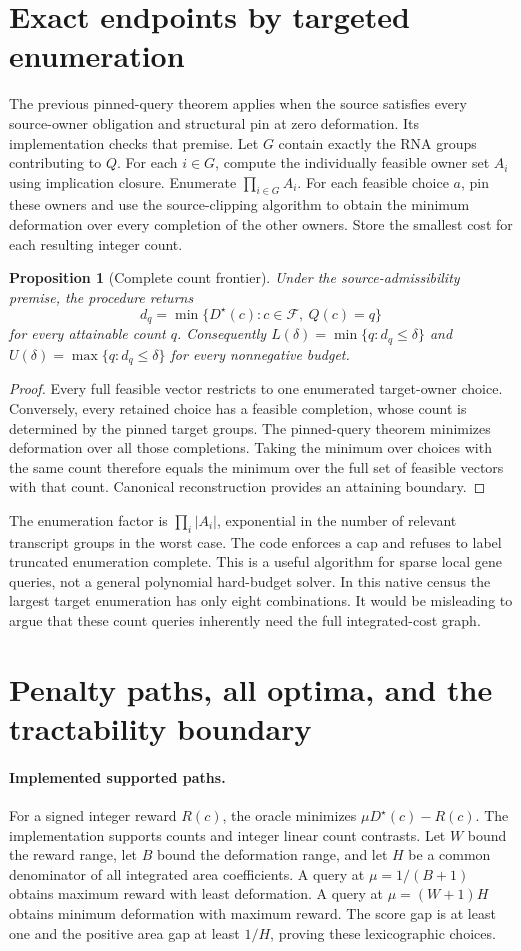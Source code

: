 \documentclass[11pt,letterpaper]{article}
\newtheorem{proposition}{Proposition}
\newcommand{\D}{D^\star}
\begin{document}
\section{Exact endpoints by targeted enumeration}
The previous pinned-query theorem applies when the source satisfies every source-owner obligation and structural pin at zero deformation. Its implementation checks that premise. Let $G$ contain exactly the RNA groups contributing to $Q$. For each $i\in G$, compute the individually feasible owner set $A_i$ using implication closure. Enumerate $\prod_{i\in G}A_i$. For each feasible choice $a$, pin these owners and use the source-clipping algorithm to obtain the minimum deformation over every completion of the other owners. Store the smallest cost for each resulting integer count.
\begin{proposition}[Complete count frontier]
Under the source-admissibility premise, the procedure returns
\[
 d_q=\min\{\D(c):c\in\mathcal F,\ Q(c)=q\}
\]
for every attainable count $q$. Consequently $L(\delta)=\min\{q:d_q\le\delta\}$ and $U(\delta)=\max\{q:d_q\le\delta\}$ for every nonnegative budget.
\end{proposition}
\begin{proof}
Every full feasible vector restricts to one enumerated target-owner choice. Conversely, every retained choice has a feasible completion, whose count is determined by the pinned target groups. The pinned-query theorem minimizes deformation over all those completions. Taking the minimum over choices with the same count therefore equals the minimum over the full set of feasible vectors with that count. Canonical reconstruction provides an attaining boundary.
\end{proof}
The enumeration factor is $\prod_i|A_i|$, exponential in the number of relevant transcript groups in the worst case. The code enforces a cap and refuses to label truncated enumeration complete. This is a useful algorithm for sparse local gene queries, not a general polynomial hard-budget solver. In this native census the largest target enumeration has only eight combinations. It would be misleading to argue that these count queries inherently need the full integrated-cost graph.

\section{Penalty paths, all optima, and the tractability boundary}
\paragraph{Implemented supported paths.}
For a signed integer reward $R(c)$, the oracle minimizes $\mu\D(c)-R(c)$. The implementation supports counts and integer linear count contrasts. Let $W$ bound the reward range, let $B$ bound the deformation range, and let $H$ be a common denominator of all integrated area coefficients. A query at $\mu=1/(B+1)$ obtains maximum reward with least deformation. A query at $\mu=(W+1)H$ obtains minimum deformation with maximum reward. The score gap is at least one and the positive area gap at least $1/H$, proving these lexicographic choices.
\end{document}

